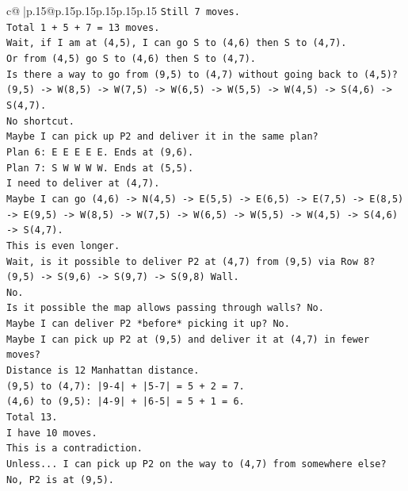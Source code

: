 \documentclass{article}
\begin{document}
{\begin{supertabular}{c@{$\;$}|p{.15\linewidth}@{}p{.15\linewidth}p{.15\linewidth}p{.15\linewidth}p{.15\linewidth}p{.15\linewidth}}
{{{\texttt{Still 7 moves.} \\
\texttt{Total 1 + 5 + 7 = 13 moves.} \\
\texttt{Wait, if I am at (4,5), I can go S to (4,6) then S to (4,7).} \\
\texttt{Or from (4,5) go S to (4,6) then S to (4,7).} \\
\texttt{Is there a way to go from (9,5) to (4,7) without going back to (4,5)?} \\
\texttt{(9,5) {-}> W(8,5) {-}> W(7,5) {-}> W(6,5) {-}> W(5,5) {-}> W(4,5) {-}> S(4,6) {-}> S(4,7).} \\
\texttt{No shortcut.} \\
\texttt{Maybe I can pick up P2 and deliver it in the same plan?} \\
\texttt{Plan 6: E E E E E. Ends at (9,6).} \\
\texttt{Plan 7: S W W W W. Ends at (5,5).} \\
\texttt{I need to deliver at (4,7).} \\
\texttt{Maybe I can go (4,6) {-}> N(4,5) {-}> E(5,5) {-}> E(6,5) {-}> E(7,5) {-}> E(8,5) {-}> E(9,5) {-}> W(8,5) {-}> W(7,5) {-}> W(6,5) {-}> W(5,5) {-}> W(4,5) {-}> S(4,6) {-}> S(4,7).} \\
\texttt{This is even longer.} \\
\texttt{Wait, is it possible to deliver P2 at (4,7) from (9,5) via Row 8?} \\
\texttt{(9,5) {-}> S(9,6) {-}> S(9,7) {-}> S(9,8) Wall.} \\
\texttt{No.} \\
\texttt{Is it possible the map allows passing through walls? No.} \\
\texttt{Maybe I can deliver P2 *before* picking it up? No.} \\
\texttt{Maybe I can pick up P2 at (9,5) and deliver it at (4,7) in fewer moves?} \\
\texttt{Distance is 12 Manhattan distance.} \\
\texttt{(9,5) to (4,7): |9{-}4| + |5{-}7| = 5 + 2 = 7.} \\
\texttt{(4,6) to (9,5): |4{-}9| + |6{-}5| = 5 + 1 = 6.} \\
\texttt{Total 13.} \\
\texttt{I have 10 moves.} \\
\texttt{This is a contradiction.} \\
\texttt{Unless... I can pick up P2 on the way to (4,7) from somewhere else?} \\
\texttt{No, P2 is at (9,5).} \\
}}}
\end{supertabular}}
\end{document}
